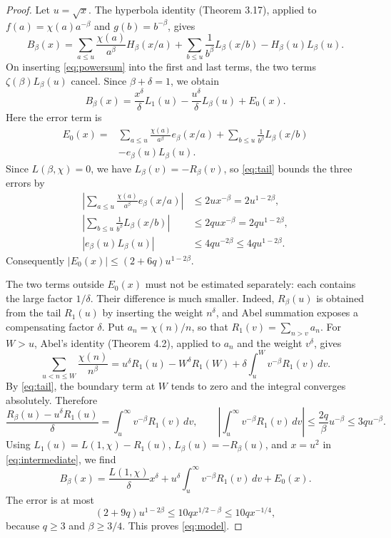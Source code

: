 \documentclass[11pt,twoside,leqno]{article}
\theoremstyle{apostol}
\begin{document}
\begin{proof}
Let \(u=\sqrt x\). The hyperbola identity (Theorem 3.17), applied to
\(f(a)=\chi(a)a^{-\beta}\) and \(g(b)=b^{-\beta}\), gives
\begin{equation}\label{eq:hyperbola}
 B_\beta(x)=\sum_{a\le u}\frac{\chi(a)}{a^\beta}H_\beta(x/a)
  +\sum_{b\le u}\frac1{b^\beta}L_\beta(x/b)
  -H_\beta(u)L_\beta(u).
\end{equation}
On inserting \eqref{eq:powersum} into the first and last terms, the two
terms \(\zeta(\beta)L_\beta(u)\) cancel. Since \(\beta+\delta=1\),
we obtain
\begin{equation}\label{eq:intermediate}
 B_\beta(x)=\frac{x^\delta}{\delta}L_1(u)
       -\frac{u^\delta}{\delta}L_\beta(u)+E_0(x).
\end{equation}
Here the error term is
\[
\begin{aligned}
 E_0(x)={}&
 \sum_{a\le u}\frac{\chi(a)}{a^\beta}e_\beta(x/a)
 +\sum_{b\le u}\frac1{b^\beta}L_\beta(x/b)\\
 &-e_\beta(u)L_\beta(u).
\end{aligned}
\]
Since \(L(\beta,\chi)=0\), we have \(L_\beta(v)=-R_\beta(v)\), so
\eqref{eq:tail} bounds the three errors by
\begin{align*}
 \left|\sum_{a\le u}\frac{\chi(a)}{a^\beta}e_\beta(x/a)\right|
   &\le2u x^{-\beta}=2u^{1-2\beta},\\
 \left|\sum_{b\le u}\frac1{b^\beta}L_\beta(x/b)\right|
   &\le2qu x^{-\beta}=2qu^{1-2\beta},\\
 |e_\beta(u)L_\beta(u)|&\le4qu^{-2\beta}\le4qu^{1-2\beta}.
\end{align*}
Consequently \(|E_0(x)|\le(2+6q)u^{1-2\beta}\).

The two terms outside \(E_0(x)\) must not be estimated separately: each
contains the large factor \(1/\delta\). Their difference is much smaller.
Indeed, \(R_\beta(u)\) is obtained from the tail \(R_1(u)\) by inserting
the weight \(n^\delta\), and Abel summation exposes a compensating factor
\(\delta\). Put \(a_n=\chi(n)/n\), so that
\(R_1(v)=\sum_{n>v}a_n\). For \(W>u\), Abel's identity (Theorem 4.2),
applied to \(a_n\) and the weight \(v^\delta\), gives
\[
 \sum_{u<n\le W}\frac{\chi(n)}{n^\beta}
 =u^\delta R_1(u)-W^\delta R_1(W)
       +\delta\int_u^W v^{-\beta}R_1(v)\,dv.
\]
By \eqref{eq:tail}, the boundary term at \(W\) tends to zero and
the integral converges absolutely. Therefore
\begin{equation}\label{eq:cancellation}
 \frac{R_\beta(u)-u^\delta R_1(u)}{\delta}
  =\int_u^\infty v^{-\beta}R_1(v)\,dv,
 \qquad
 \left|\int_u^\infty v^{-\beta}R_1(v)\,dv\right|
       \le\frac{2q}{\beta}u^{-\beta}\le3qu^{-\beta}.
\end{equation}
Using \(L_1(u)=L(1,\chi)-R_1(u)\),
\(L_\beta(u)=-R_\beta(u)\), and \(x=u^2\) in
\eqref{eq:intermediate}, we find
\[
 B_\beta(x)=\frac{L(1,\chi)}{\delta}x^\delta
    +u^\delta\int_u^\infty v^{-\beta}R_1(v)\,dv+E_0(x).
\]
The error is at most
\[
 (2+9q)u^{1-2\beta}\le10q x^{1/2-\beta}\le10q x^{-1/4},
\]
because \(q\ge3\) and \(\beta\ge3/4\). This proves
\eqref{eq:model}.
\end{proof}
\end{document}
